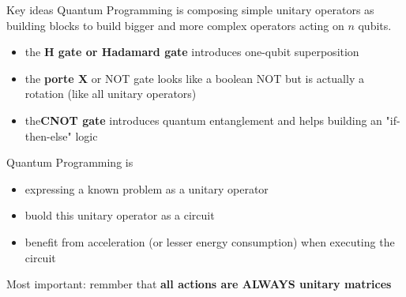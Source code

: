 \begin{frame}{Key ideas}
Quantum Programming is composing simple unitary operators as building blocks to build bigger and more complex operators
acting on $n$ qubits.
\begin{itemize}
    \item the \textbf{H gate or Hadamard gate} introduces one-qubit superposition
    \item the \textbf{porte X} or NOT gate looks like a boolean NOT but is actually a rotation (like all unitary operators) 
    \item the\textbf{CNOT gate} introduces quantum entanglement and helps building an "if-then-else" logic
\end{itemize}


Quantum Programming is
\begin{itemize}
    \item expressing a known problem as a unitary operator
    \item buold this unitary operator as a circuit
    \item benefit from acceleration (or lesser energy consumption) when executing the circuit
\end{itemize}
Most important: remmber that \textbf{all actions are ALWAYS unitary matrices}
\end{frame}
